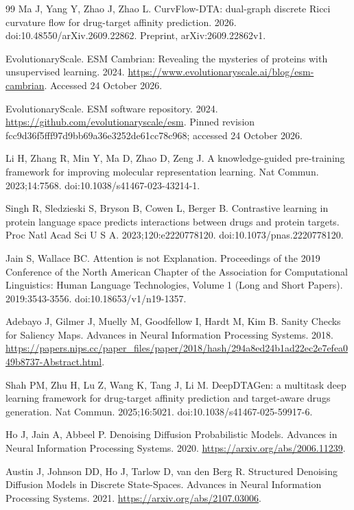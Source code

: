 \documentclass[12pt,a4paper]{article}
\begin{document}
\begin{thebibliography}{99}
 Ma J, Yang Y, Zhao J, Zhao L. CurvFlow-DTA: dual-graph discrete Ricci curvature flow for drug-target affinity prediction. 2026. doi:10.48550/arXiv.2609.22862. Preprint, arXiv:2609.22862v1.

 EvolutionaryScale. ESM Cambrian: Revealing the mysteries of proteins with unsupervised learning. 2024. \url{https://www.evolutionaryscale.ai/blog/esm-cambrian}. Accessed 24 October 2026.

 EvolutionaryScale. ESM software repository. 2024. \url{https://github.com/evolutionaryscale/esm}. Pinned revision fcc9d36f5fff97d9bb69a36e3252de61cc78c968; accessed 24 October 2026.

 Li H, Zhang R, Min Y, Ma D, Zhao D, Zeng J. A knowledge-guided pre-training framework for improving molecular representation learning. Nat Commun. 2023;14:7568. doi:10.1038/s41467-023-43214-1.

 Singh R, Sledzieski S, Bryson B, Cowen L, Berger B. Contrastive learning in protein language space predicts interactions between drugs and protein targets. Proc Natl Acad Sci U S A. 2023;120:e2220778120. doi:10.1073/pnas.2220778120.

 Jain S, Wallace BC. Attention is not Explanation. Proceedings of the 2019 Conference of the North American Chapter of the Association for Computational Linguistics: Human Language Technologies, Volume 1 (Long and Short Papers). 2019:3543-3556. doi:10.18653/v1/n19-1357.

 Adebayo J, Gilmer J, Muelly M, Goodfellow I, Hardt M, Kim B. Sanity Checks for Saliency Maps. Advances in Neural Information Processing Systems. 2018. \url{https://papers.nips.cc/paper_files/paper/2018/hash/294a8ed24b1ad22ec2e7efea049b8737-Abstract.html}.

 Shah PM, Zhu H, Lu Z, Wang K, Tang J, Li M. DeepDTAGen: a multitask deep learning framework for drug-target affinity prediction and target-aware drugs generation. Nat Commun. 2025;16:5021. doi:10.1038/s41467-025-59917-6.

 Ho J, Jain A, Abbeel P. Denoising Diffusion Probabilistic Models. Advances in Neural Information Processing Systems. 2020. \url{https://arxiv.org/abs/2006.11239}.

 Austin J, Johnson DD, Ho J, Tarlow D, van den Berg R. Structured Denoising Diffusion Models in Discrete State-Spaces. Advances in Neural Information Processing Systems. 2021. \url{https://arxiv.org/abs/2107.03006}.


\end{thebibliography}
\end{document}
